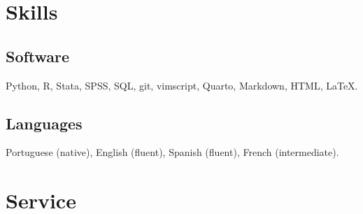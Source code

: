 \documentclass[a4paper]{article}
\renewenvironment{itemize}{
	\begin{list}{}{
			\setlength{\leftmargin}{1.5em}
		}
		}{
	\end{list}
}
\begin{document}
\section*{Skills}

\subsection*{Software}

\begin{itemize}
\item Python, R, Stata, SPSS, SQL, git, vimscript, Quarto, Markdown, HTML, \LaTeX{}.
\end{itemize}

\subsection*{Languages}

\begin{itemize}
\item Portuguese (native), English (fluent), Spanish (fluent), French (intermediate).
\end{itemize}



\section*{Service}
\end{document}
